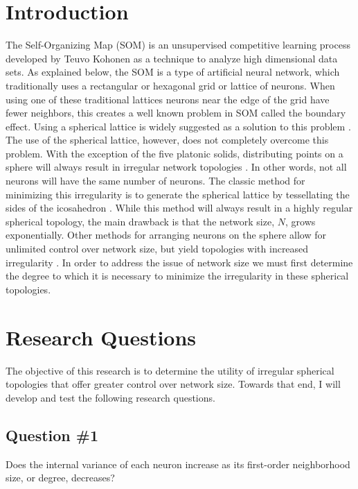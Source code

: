 \documentclass[10pt,titlepage]{article}
\begin{document}
\section{Introduction}
The Self-Organizing Map (SOM) is an unsupervised competitive learning process
developed by Teuvo Kohonen as a technique to analyze high dimensional data sets.
As explained below, the SOM is a type of artificial neural network, which
traditionally uses a rectangular or hexagonal grid or lattice of neurons.  When
using one of these traditional lattices neurons near the edge of the grid have
fewer neighbors, this creates a well known problem in SOM called the boundary
effect. Using a spherical lattice is widely suggested as a solution to this problem
\citep{ritter99, boudjemai2003, sangole03, wu2006, Nishio:2006fk}.  The
use of the spherical lattice, however, does not completely overcome this
problem.  With the exception of the five platonic solids, distributing points on
a sphere will always result in irregular network topologies \citep{ritter99,
harris2000}.  In other words, not all neurons will have the same number of
neurons.  The classic method for minimizing this irregularity is to generate
the spherical lattice by tessellating the sides of the icosahedron
\citep{Nishio:2006fk}.  While this method will always result in a highly regular
spherical topology, the main drawback is that the network size, \(N\), grows
exponentially. Other methods for arranging neurons on the sphere allow for
unlimited control over network size, but yield topologies with increased
irregularity \citep{harris2000, wu2005, Nishio:2006fk}.  In order to address the
issue of network size we must first determine the degree to which it is
necessary to minimize the irregularity in these spherical topologies.

\section{Research Questions}
The objective of this research is to determine the utility of irregular
spherical topologies that offer greater control over network size. Towards that
end, I will develop and test the following research questions.
\subsection{Question \#1}
Does the internal variance of each neuron increase as its first-order
neighborhood size, or degree, decreases?
\end{document}
